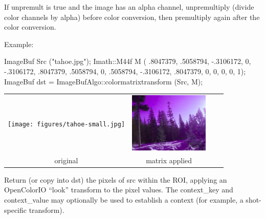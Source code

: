 If {\cf unpremult} is {\cf true} and the image has an alpha channel,
unpremultiply (divide color channels by alpha) before color conversion, then
premultiply again after the color conversion.

\smallskip
\noindent Example:
\begin{code}
    ImageBuf Src ("tahoe.jpg");
    Imath::M44f M ( .8047379,  .5058794, -.3106172, 0,
                   -.3106172,  .8047379,  .5058794, 0,
                    .5058794, -.3106172,  .8047379, 0,
                     0,         0,         0,       1);
    ImageBuf dst = ImageBufAlgo::colormatrixtransform (Src, M);
\end{code}

\noindent \begin{tabular}{cccc}
\texttt{[image: figures/tahoe-small.jpg]} &
\includegraphics[width=1.5in]{figures/tahoe-ccmatrix.jpg} \\
original & matrix applied \\
\end{tabular}
\apiend


 
Return (or copy into {\cf dst}) the pixels of {\cf src} within the ROI,
applying an OpenColorIO ``look'' transform to the pixel values.
The {\cf context_key} and {\cf context_value} may optionally be used
to establish a context (for example, a shot-specific transform).

